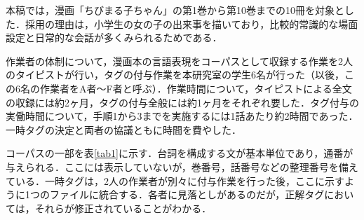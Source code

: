 \documentclass[japanese]{jnlp_1.3c}
\begin{document}
本稿では，漫画「ちびまる子ちゃん」の第1巻から第10巻までの10冊\cite{さくら87-93}を対象とした．採用の理由は，小学生の女の子の出来事を描いており，比較的常識的な場面設定と日常的な会話が多くみられるためである．

作業者の体制について，漫画本の言語表現をコーパスとして収録する作業を2人のタイピストが行い，タグの付与作業を本研究室の学生6名が行った（以後，この6名の作業者をA者〜F者と呼ぶ）．作業時間について，タイピストによる全文の収録には約2ヶ月，タグの付与全般には約1ヶ月をそれぞれ要した．タグ付与の実働時間について，手順1から3までを実施するには1話あたり約2時間であった．一時タグの決定と両者の協議ともに時間を費やした．

コーパスの一部を表\ref{tab1}に示す．台詞を構成する文が基本単位であり，通番が与えられる．ここには表示していないが，巻番号，話番号などの整理番号を備えている．一時タグは，2人の作業者が別々に付与作業を行った後，ここに示すように1つのファイルに統合する．各者に見落としがあるのだが，正解タグにおいては，それらが修正されていることがわかる．
\end{document}
